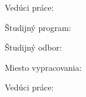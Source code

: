 


Vedúci práce: \mySupervisor

\medskip{}
\myDate


\newpage
\thispagestyle{empty}
\mbox{}
\newpage





Študijný program: \myStudyProgramSK

Študijný odbor: \myDegreeCourseSK

Miesto vypracovania: \myInstituteSK

Vedúci práce: \mySupervisor

\medskip{}

\myDate


\newpage
\thispagestyle{empty}
\mbox{}
\newpage

